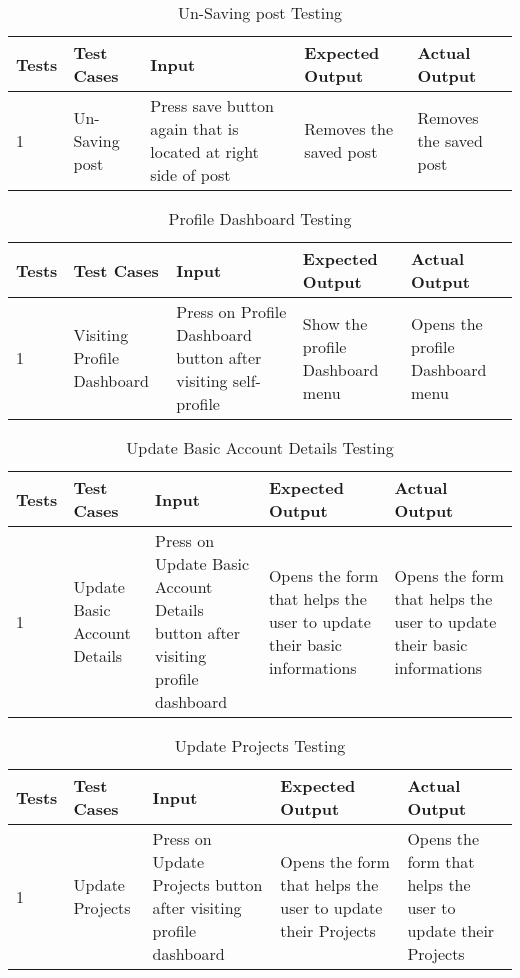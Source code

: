 \begin{table}[H]
    \caption{Un-Saving post Testing}
        \label{}
    \begin{tabular}{|p{0.3in}|p{1.2in}|p{1.2in}|p{1.2in}|p{1in}|}
        \hline
        Tests & Test Cases & Input &Expected Output & Actual Output \\
        \hline
            1 &Un-Saving post & Press save button again that is located at right side of post & Removes the saved post &  Removes the saved post  \\
            \hline
\end{tabular}
\end{table}

\begin{table}[H]
    \caption{Profile Dashboard Testing}
        \label{}
    \begin{tabular}{|p{0.3in}|p{1.2in}|p{1.2in}|p{1.2in}|p{1in}|}
        \hline
        Tests & Test Cases & Input &Expected Output & Actual Output \\
        \hline
            1 &Visiting Profile Dashboard & Press on Profile Dashboard button after visiting self-profile &Show the profile Dashboard menu &Opens the profile Dashboard menu  \\
            \hline
\end{tabular}
\end{table}


\begin{table}[H]
    \caption{Update Basic Account Details Testing}
        \label{}
    \begin{tabular}{|p{0.3in}|p{1.2in}|p{1.2in}|p{1.2in}|p{1in}|}
        \hline
        Tests & Test Cases & Input &Expected Output & Actual Output \\
        \hline
            1 &Update Basic Account Details & Press on Update Basic Account Details button after visiting profile dashboard &Opens the form that helps the user to update their basic informations  &Opens the form that helps the user to update their basic informations  \\
            \hline
\end{tabular}
\end{table}

\begin{table}[H]
    \caption{Update Projects Testing}
        \label{}
    \begin{tabular}{|p{0.3in}|p{1.2in}|p{1.2in}|p{1.2in}|p{1in}|}
        \hline
        Tests & Test Cases & Input &Expected Output & Actual Output \\
        \hline
            1 &Update Projects & Press on Update Projects button after visiting profile dashboard &Opens the form that helps the user to update their Projects  &Opens the form that helps the user to update their Projects  \\
            \hline
\end{tabular}
\end{table}

